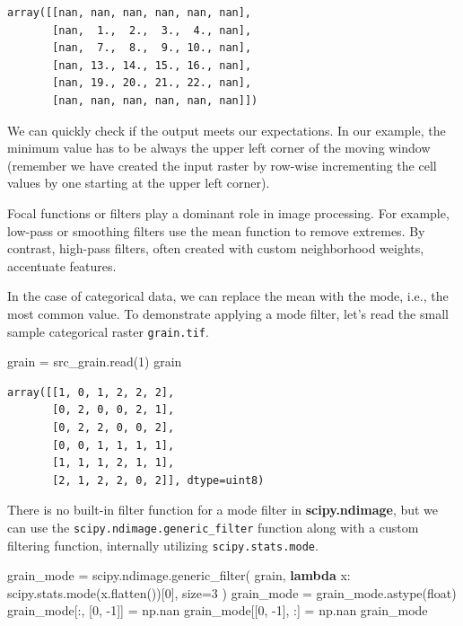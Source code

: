 \documentclass[
  letterpaper,
]{krantz}
\newenvironment{Shaded}{\begin{snugshade}}{\end{snugshade}}
\newcommand{\BuiltInTok}[1]{\textcolor[rgb]{0.00,0.23,0.31}{#1}}
\newcommand{\DecValTok}[1]{\textcolor[rgb]{0.68,0.00,0.00}{#1}}
\newcommand{\KeywordTok}[1]{\textcolor[rgb]{0.00,0.23,0.31}{\textbf{#1}}}
\newcommand{\NormalTok}[1]{\textcolor[rgb]{0.00,0.23,0.31}{#1}}
\newcommand{\OperatorTok}[1]{\textcolor[rgb]{0.37,0.37,0.37}{#1}}
\begin{document}
\begin{verbatim}
array([[nan, nan, nan, nan, nan, nan],
       [nan,  1.,  2.,  3.,  4., nan],
       [nan,  7.,  8.,  9., 10., nan],
       [nan, 13., 14., 15., 16., nan],
       [nan, 19., 20., 21., 22., nan],
       [nan, nan, nan, nan, nan, nan]])
\end{verbatim}

We can quickly check if the output meets our expectations. In our
example, the minimum value has to be always the upper left corner of the
moving window (remember we have created the input raster by row-wise
incrementing the cell values by one starting at the upper left corner).

Focal functions or filters play a dominant role in image processing. For
example, low-pass or smoothing filters use the mean function to remove
extremes. By contrast, high-pass filters, often created with custom
neighborhood weights, accentuate features.

In the case of categorical data, we can replace the mean with the mode,
i.e., the most common value. To demonstrate applying a mode filter,
let's read the small sample categorical raster \texttt{grain.tif}.

\begin{Shaded}
\begin{Highlighting}[]
\NormalTok{grain }\OperatorTok{=}\NormalTok{ src\_grain.read(}\DecValTok{1}\NormalTok{)}
\NormalTok{grain}
\end{Highlighting}
\end{Shaded}

\begin{verbatim}
array([[1, 0, 1, 2, 2, 2],
       [0, 2, 0, 0, 2, 1],
       [0, 2, 2, 0, 0, 2],
       [0, 0, 1, 1, 1, 1],
       [1, 1, 1, 2, 1, 1],
       [2, 1, 2, 2, 0, 2]], dtype=uint8)
\end{verbatim}

There is no built-in filter function for a mode filter in
\textbf{scipy.ndimage}, but we can use the
\texttt{scipy.ndimage.generic\_filter} function along with a custom
filtering function, internally utilizing \texttt{scipy.stats.mode}.

\begin{Shaded}
\begin{Highlighting}[]
\NormalTok{grain\_mode }\OperatorTok{=}\NormalTok{ scipy.ndimage.generic\_filter(}
\NormalTok{    grain, }
    \KeywordTok{lambda}\NormalTok{ x: scipy.stats.mode(x.flatten())[}\DecValTok{0}\NormalTok{], }
\NormalTok{    size}\OperatorTok{=}\DecValTok{3}
\NormalTok{)}
\NormalTok{grain\_mode }\OperatorTok{=}\NormalTok{ grain\_mode.astype(}\BuiltInTok{float}\NormalTok{)}
\NormalTok{grain\_mode[:, [}\DecValTok{0}\NormalTok{, }\OperatorTok{{-}}\DecValTok{1}\NormalTok{]] }\OperatorTok{=}\NormalTok{ np.nan}
\NormalTok{grain\_mode[[}\DecValTok{0}\NormalTok{, }\OperatorTok{{-}}\DecValTok{1}\NormalTok{], :] }\OperatorTok{=}\NormalTok{ np.nan}
\NormalTok{grain\_mode}
\end{Highlighting}
\end{Shaded}
\end{document}
